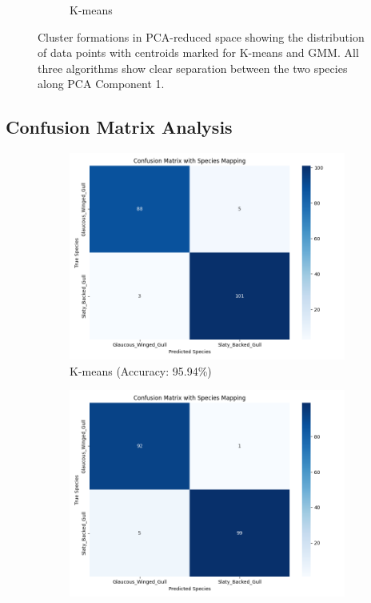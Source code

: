 \documentclass[a4paper,12pt]{report}
\begin{document}
\begin{figure}[H]
\begin{subfigure}[b]{0.32\textwidth}
        \caption{K-means}
        \label{fig:kmeans_cluster}
    \end{subfigure}
    \caption{Cluster formations in PCA-reduced space showing the distribution of data points with centroids marked for K-means and GMM. All three algorithms show clear separation between the two species along PCA Component 1.}
    \label{fig:cluster_visualizations}
\end{figure}

\subsection{Confusion Matrix Analysis}

\begin{figure}[H]
    \centering
    \begin{subfigure}[b]{0.32\textwidth}
        \centering
        \includegraphics[width=\textwidth]{images/clustering/kmeans_confusion_matrix.png}
        \caption{K-means (Accuracy: 95.94\%)}
        \label{fig:kmeans_cm}
    \end{subfigure}
    \hfill
    \begin{subfigure}[b]{0.32\textwidth}
        \centering
        \includegraphics[width=\textwidth]{images/clustering/hierarchical_confusion_matrix.png}

\end{subfigure}
\end{figure}
\end{document}
